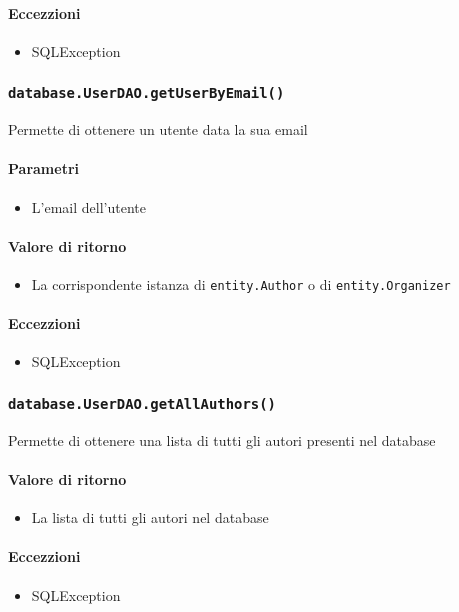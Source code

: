 \paragraph{Eccezzioni}
\begin{itemize}
  \item SQLException
\end{itemize}

\subsubsection{\texttt{database.UserDAO.getUserByEmail()}}
Permette di ottenere un utente data la sua email
\paragraph{Parametri}
\begin{itemize}
\item L'email dell'utente
\end{itemize}
\paragraph{Valore di ritorno}
\begin{itemize}
\item La corrispondente istanza di \texttt{entity.Author} o di
  \texttt{entity.Organizer}
\end{itemize}
\paragraph{Eccezzioni}
\begin{itemize}
  \item SQLException
\end{itemize}

\subsubsection{\texttt{database.UserDAO.getAllAuthors()}} Permette
di ottenere una lista di tutti gli autori presenti nel database
\paragraph{Valore di ritorno}
\begin{itemize}
\item La lista di tutti gli autori nel database
\end{itemize}
\paragraph{Eccezzioni}
\begin{itemize}
  \item SQLException
\end{itemize}

